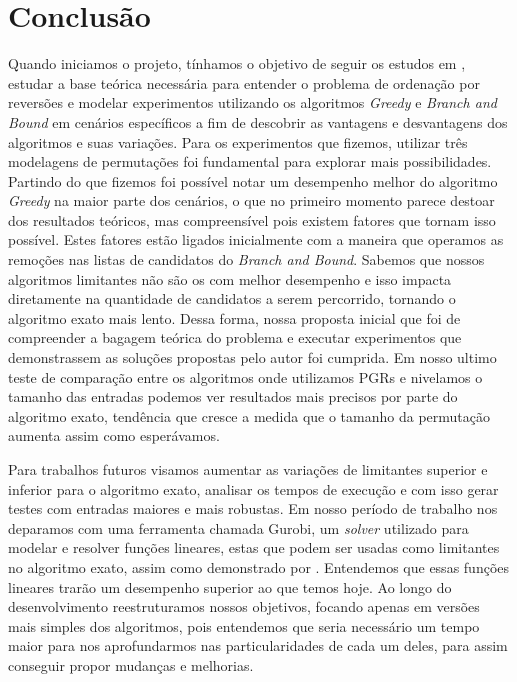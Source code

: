\chapter{Conclusão}
\label{cap:conclusao}

    Quando iniciamos o projeto, tínhamos o objetivo de seguir os estudos em \cite{kececioglu1995exact}, estudar a base  teórica necessária para entender o problema de ordenação por reversões e modelar experimentos utilizando os algoritmos \textit{Greedy} e \textit{Branch and Bound} em cenários específicos a fim de descobrir as vantagens e desvantagens dos algoritmos e suas variações. Para os experimentos que fizemos, utilizar três modelagens de permutações foi fundamental para explorar mais possibilidades. Partindo do que fizemos foi possível notar um desempenho melhor do algoritmo \textit{Greedy} na maior parte dos cenários, o que no primeiro momento parece destoar dos resultados teóricos, mas compreensível pois existem fatores que tornam isso possível. Estes fatores estão ligados inicialmente com a maneira que operamos as remoções nas listas de candidatos do \textit{Branch and Bound}. Sabemos que nossos algoritmos limitantes não são os com melhor desempenho e isso impacta diretamente na quantidade de candidatos a serem percorrido, tornando o algoritmo exato mais lento. Dessa forma, nossa proposta inicial que foi de compreender a bagagem teórica do problema e executar experimentos que demonstrassem as soluções propostas pelo autor foi cumprida. Em nosso ultimo teste de comparação entre os algoritmos onde utilizamos PGRs e nivelamos o tamanho das entradas podemos ver resultados mais precisos por parte do algoritmo exato, tendência que cresce a medida que o tamanho da permutação aumenta assim como esperávamos. 
    
    Para trabalhos futuros visamos aumentar as variações de limitantes superior e inferior para o algoritmo exato, analisar os tempos de execução e com isso gerar testes com entradas maiores e mais robustas. Em nosso período de trabalho nos deparamos com uma ferramenta chamada Gurobi, um \textit{solver} utilizado para modelar e resolver funções lineares, estas que podem ser usadas como limitantes no algoritmo exato, assim como demonstrado por \cite{kececioglu1995exact}. Entendemos que essas funções lineares trarão um desempenho superior ao que temos hoje. Ao longo do desenvolvimento reestruturamos nossos objetivos, focando apenas em versões mais simples dos algoritmos, pois entendemos que seria necessário um tempo maior para nos aprofundarmos nas particularidades de cada um deles, para assim conseguir propor mudanças e melhorias.





